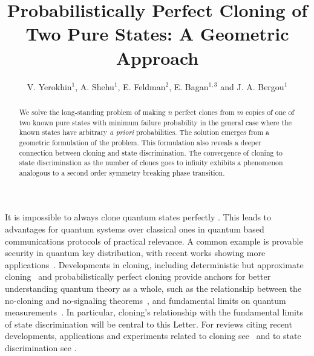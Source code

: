 \documentclass[aps,prl,twocolumn,showpacs]{revtex4}
\begin{document}
  \title{Probabilistically Perfect Cloning of Two Pure States: A Geometric Approach}
\author{V. Yerokhin$^{1}$, A. Shehu$^{1}$, E. Feldman$^{2}$, E. Bagan$^{1,3}$ and J. A. Bergou$^{1}$}

\begin{abstract} 
We solve the long-standing problem of making $n$ perfect clones from $m$ copies of one of two known pure states with minimum failure probability in the general case where the known states have arbitrary {\emph{a priori}} probabilities.  
The solution emerges from a geometric formulation of the problem. This formulation also reveals a deeper connection between cloning and state discrimination. The convergence of cloning to state discrimination as the number of clones goes to infinity exhibits a phenomenon analogous to a second order symmetry breaking phase transition.
\end{abstract}
\maketitle 

It is impossible to always clone quantum states perfectly \cite{Wooters, Dieks}.  This leads to advantages for quantum systems over classical ones in quantum based communications protocols of practical relevance.  A common example is provable security in quantum key distribution, with recent works showing more applications~\cite{Pomarico, Bart}.  Developments in cloning, including deterministic but approximate cloning~\cite{Buzek1,Gisin1,Buzek2,Brub,Chefles1,Fiurasek} and probabilistically perfect cloning \cite {DuanGuo,Fiurasek1,Muller} provide anchors for better understanding quantum theory as a whole, such as the relationship between the no-cloning and no-signaling theorems~\cite{Barnum}, and  fundamental limits on quantum measurements~\cite{Chiribella,Bae,Chiribella2006,Gendra}. In particular, cloning's relationship with the fundamental limits of state discrimination will be central to this Letter. For reviews citing recent developments, applications and experiments related to cloning see~\cite{review1,Fan} and to state discrimination see \cite{Bergou}.
\end{document}
